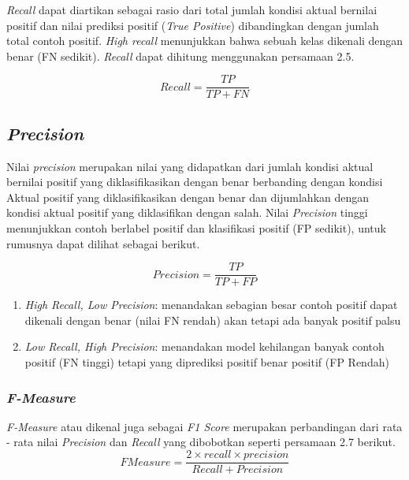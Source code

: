 \emph{Recall} dapat diartikan sebagai rasio dari total jumlah kondisi aktual bernilai positif dan nilai prediksi positif (\emph{True Positive}) dibandingkan
dengan jumlah total contoh positif. \emph{High recall} menunjukkan bahwa sebuah kelas dikenali dengan benar (FN sedikit). \emph{Recall} dapat dihitung menggunakan 
persamaan 2.5.

\begin{equation}
  Recall = \frac{TP}{TP + FN}
\end{equation}

\subsection{\emph{Precision}}
\label{subsec:precision}

Nilai \emph{precision} merupakan nilai yang didapatkan dari jumlah kondisi aktual bernilai positif yang diklasifikasikan dengan benar berbanding dengan kondisi Aktual
positif yang diklasifikasikan dengan benar dan dijumlahkan dengan kondisi aktual positif yang diklasifikan dengan salah. Nilai \emph{Precision} tinggi menunjukkan
contoh berlabel positif dan klasifikasi positif (FP sedikit), untuk rumusnya dapat dilihat sebagai berikut.

\begin{equation}
  Precision = \frac{TP}{TP + FP}
\end{equation}

\begin{enumerate}
  \item \emph{High Recall, Low Precision}: menandakan sebagian besar contoh positif dapat dikenali dengan benar (nilai FN rendah) akan tetapi ada banyak positif palsu
  \item \emph{Low Recall, High Precision}: menandakan model kehilangan banyak contoh positif (FN tinggi) tetapi yang diprediksi positif benar positif (FP Rendah)
\end{enumerate}

\subsubsection{\emph{F-Measure}}
\label{subsec:f1-score}

\emph{F-Measure} atau dikenal juga sebagai \emph{F1 Score} merupakan perbandingan dari rata - rata nilai \emph{Precision} dan \emph{Recall} yang dibobotkan seperti persamaan 2.7 berikut.
\begin{equation}
  FMeasure = \frac{2 \times recall \times precision}{Recall + Precision}
\end{equation}

